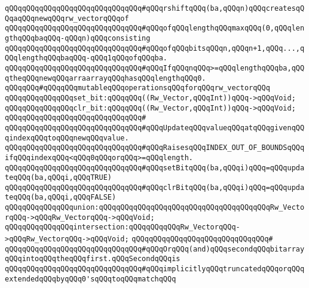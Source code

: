 \verb|qQQqqQQqqQQqqQQqqQQqqQQqqQQqqQQq#qQQqrshiftqQQq(ba,qQQqn)qQQqcreatesqQQqaqQQqnewqQQqrw_vectorqQQqof|\newline
\verb|qQQqqQQqqQQqqQQqqQQqqQQqqQQqqQQq#qQQqofqQQqlengthqQQqmaxqQQq(0,qQQqlengthqQQqbaqQQq-qQQqn)qQQqconsisting|\newline
\verb|qQQqqQQqqQQqqQQqqQQqqQQqqQQqqQQq#qQQqofqQQqbitsqQQqn,qQQqn+1,qQQq...,qQQqlengthqQQqbaqQQq-qQQq1qQQqofqQQqba.|\newline
\verb|qQQqqQQqqQQqqQQqqQQqqQQqqQQqqQQq#qQQqIfqQQqnqQQq>=qQQqlengthqQQqba,qQQqtheqQQqnewqQQqarraarrayqQQqhasqQQqlengthqQQq0.|\newline
\newline
\verb|qQQqqQQq#qQQqqQQqmutableqQQqoperationsqQQqforqQQqrw_vectorqQQq|\newline
\newline
\verb|qQQqqQQqqQQqqQQqset_bit:qQQqqQQq((Rw_Vector,qQQqInt))qQQq->qQQqVoid;|\newline
\verb|qQQqqQQqqQQqqQQqclr_bit:qQQqqQQq((Rw_Vector,qQQqInt))qQQq->qQQqVoid;|\newline
\verb|qQQqqQQqqQQqqQQqqQQqqQQqqQQqqQQq#|\newline
\verb|qQQqqQQqqQQqqQQqqQQqqQQqqQQqqQQq#qQQqUpdateqQQqvalueqQQqatqQQqgivenqQQqindexqQQqtoqQQqnewqQQqvalue.|\newline
\verb|qQQqqQQqqQQqqQQqqQQqqQQqqQQqqQQq#qQQqRaisesqQQqINDEX_OUT_OF_BOUNDSqQQqifqQQqindexqQQq<qQQq0qQQqorqQQq>=qQQqlength.|\newline
\verb|qQQqqQQqqQQqqQQqqQQqqQQqqQQqqQQq#qQQqsetBitqQQq(ba,qQQqi)qQQq=qQQqupdateqQQq(ba,qQQqi,qQQqTRUE)|\newline
\verb|qQQqqQQqqQQqqQQqqQQqqQQqqQQqqQQq#qQQqclrBitqQQq(ba,qQQqi)qQQq=qQQqupdateqQQq(ba,qQQqi,qQQqFALSE)|\newline
\newline
\verb|qQQqqQQqqQQqqQQqunion:qQQqqQQqqQQqqQQqqQQqqQQqqQQqqQQqqQQqqQQqRw_VectorqQQq->qQQqRw_VectorqQQq->qQQqVoid;|\newline
\verb|qQQqqQQqqQQqqQQqintersection:qQQqqQQqqQQqRw_VectorqQQq->qQQqRw_VectorqQQq->qQQqVoid;|\newline
\verb|qQQqqQQqqQQqqQQqqQQqqQQqqQQqqQQq#|\newline
\verb|qQQqqQQqqQQqqQQqqQQqqQQqqQQqqQQq#qQQqOrqQQq(and)qQQqsecondqQQqbitarrayqQQqintoqQQqtheqQQqfirst.qQQqSecondqQQqis|\newline
\verb|qQQqqQQqqQQqqQQqqQQqqQQqqQQqqQQq#qQQqimplicitlyqQQqtruncatedqQQqorqQQqextendedqQQqbyqQQq0'sqQQqtoqQQqmatchqQQq|\newline
